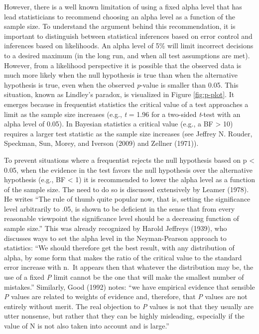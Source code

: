 \documentclass[
  english,
  ,jou, a4paper,floatsintext]{apa6}
\begin{document}
However, there is a well known limitation of using a fixed alpha level that has lead statisticians to recommend choosing an alpha level as a function of the sample size. To understand the argument behind this recommendation, it is important to distinguish between statistical inferences based on error control and inferences based on likelihoods. An alpha level of 5\% will limit incorrect decisions to a desired maximum (in the long run, and when all test assumptions are met). However, from a likelihood perspective it is possible that the observed data is much more likely when the null hypothesis is true than when the alternative hypothesis is true, even when the observed \emph{p}-value is smaller than 0.05. This situation, known as Lindley's paradox, is visualized in Figure \ref{fig:p-plot}. It emerges because in frequentist statistics the critical value of a test approaches a limit as the sample size increases (e.g., \emph{t} = 1.96 for a two-sided \emph{t}-test with an alpha level of 0.05). In Bayesian statistics a critical value (e.g., a BF \textgreater{} 10) requires a larger test statistic as the sample size increases (see Jeffrey N. Rouder, Speckman, Sun, Morey, and Iverson (2009) and Zellner (1971)).

To prevent situations where a frequentist rejects the null hypothesis based on p \textless{} 0.05, when the evidence in the test favors the null hypothesis over the alternative hypothesis (e.g., BF \textless{} 1) it is recommended to lower the alpha level as a function of the sample size. The need to do so is discussed extensively by Leamer (1978). He writes ``The rule of thumb quite popular now, that is, setting the significance level arbitrarily to .05, is shown to be deficient in the sense that from every reasonable viewpoint the significance level should be a decreasing function of sample size.'' This was already recognized by Harold Jeffreys (1939), who discusses ways to set the alpha level in the Neyman-Pearson approach to statistics: ``We should therefore get the best result, with any distribution of alpha, by some form that makes the ratio of the critical value to the standard error increase with n.~It appears then that whatever the distribution may be, the use of a fixed \emph{P} limit cannot be the one that will make the smallest number of mistakes.'' Similarly, Good (1992) notes: ``we have empirical evidence that sensible \emph{P} values are related to weights of evidence and, therefore, that \emph{P} values are not entirely without merit. The real objection to \emph{P} values is not that they usually are utter nonsense, but rather that they can be highly misleading, especially if the value of N is not also taken into account and is large.''
\end{document}
